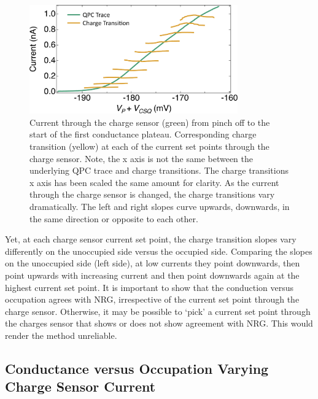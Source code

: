 \begin{figure}[!bht]
 \begin{center}
 \includegraphics[width=0.8\textwidth]{figures/ch3/crop_FiguresMaster.016.png}
 \caption[Charge transitions measured at various current set points through the charge sensor]{\label{fig:ch3/cond_occ_ct_set-points} 
 Current through the charge sensor (green) from pinch off to the start of the first conductance plateau. Corresponding charge transition (yellow) at each of the current set points through the charge sensor. Note, the x axis is not the same between the underlying QPC trace and charge transitions. The charge transitions x axis has been scaled the same amount for clarity. As the current through the charge sensor is changed, the charge transitions vary dramatically. The left and right slopes curve upwards, downwards, in the same direction or opposite to each other.}
 \end{center}
\end{figure}
\FloatBarrier

Yet, at each charge sensor current set point, the charge transition slopes vary differently on the unoccupied side versus the occupied side. Comparing the slopes on the unoccupied side (left side), at low currents they point downwards, then point upwards with increasing current and then point downwards again at the highest current set point. It is important to show that the conduction versus occupation agrees with NRG, irrespective of the current set point through the charge sensor. Otherwise, it may be possible to `pick' a current set point through the charges sensor that shows or does not show agreement with NRG. This would render the method unreliable. 




\subsection{Conductance versus Occupation Varying Charge Sensor Current}



